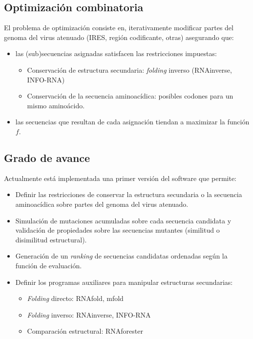 \documentclass{beamer}
\begin{document}
\subsection{Optimizaci\'on combinatoria}
\begin{frame}
El problema de optimizaci\'on consiste en, iterativamente modificar partes
del genoma del virus atenuado (IRES, regi\'on codificante, otras) asegurando
que:
  \begin{itemize}
   \item las (sub)secuencias asignadas satisfacen las restricciones impuestas:
    \begin{itemize}
     \item Conservaci\'on de estructura secundaria: \textit{folding} inverso
(RNAinverse, INFO-RNA)
     \item Conservaci\'on de la secuencia aminoac\'idica: posibles codones para
un mismo amino\'acido.
    \end{itemize}
   \item las secuencias que resultan de cada asignaci\'on tiendan a maximizar la
funci\'on $f$.
  \end{itemize}
\end{frame}

\subsection{Grado de avance}
\begin{frame}
Actualmente est\'a implementada una primer versi\'on del software que permite:
  \begin{itemize}
   \item Definir las restricciones de conservar la estructura secundaria o la
secuencia aminoac\'idica sobre partes del genoma del virus atenuado.
   \item Simulaci\'on de mutaciones acumuladas sobre cada secuencia candidata
y validaci\'on de propiedades sobre las secuencias mutantes (similitud o
disimilitud estructural).
   \item Generaci\'on de un \textit{ranking} de secuencias candidatas ordenadas
seg\'un la funci\'on de evaluaci\'on.
   \item Definir los programas auxiliares para manipular estructuras
secundarias:
    \begin{itemize}
     \item \textit{Folding} directo: RNAfold, mfold
     \item \textit{Folding} inverso: RNAinverse, INFO-RNA
     \item Comparaci\'on estructural: RNAforester
    \end{itemize}
  \end{itemize}
\end{frame}
\end{document}
